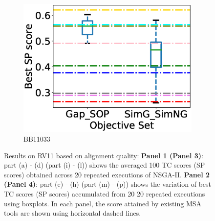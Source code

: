 \begin{figure}[!htbp]
\begin{adjustwidth}{-1cm}{-1cm}
\begin{subfigure}{0.26\textwidth}
			\includegraphics[width=\columnwidth]{Figure/summary/precomputedInit/Balibase/BB11033_objset_pairs_rank_2}
			\caption{BB11033}
\end{subfigure}
	\end{adjustwidth}
	\caption[Results on RV11 based on alignment quality]{\underline{Results on RV11 based on alignment quality:} \textbf{Panel 1 (Panel 3)}: part (a) - (d) (part (i) - (l)) shows the averaged 100 TC scores (SP scores) obtained across 20 repeated executions of NSGA-II. 
\textbf{Panel 2 (Panel 4)}: part (e) - (h) (part (m) - (p)) shows the variation of best TC scores (SP scores) accumulated from 20 20 repeated executions using boxplots. In each panel, the score attained by existing MSA tools are shown  using horizontal dashed lines.}
	\label{fig:rv11_tc_sp}
	
\end{figure}

